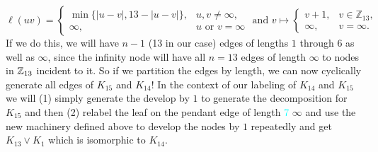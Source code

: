 $$\ell(uv)=\begin{cases}\min\{|u-v|,13-|u-v|\}, & u,v\neq \infty, \\ \infty, & u\text{ or }v=\infty \end{cases} \text{ and }v\mapsto 
\begin{cases}
  v+1,&v\in\mathbb{Z}_{13},\\
  \infty,        &v=\infty.
  \end{cases}$$
If we do this, we will have $n-1$ (13 in our case) edges of lengths $1$ through $6$ as well as $\infty$, since the infinity node will have all $n=13$ edges of length $\infty$ to nodes in $\mathbb{Z}_{13}$ incident to it. So if we partition the edges by length, we can now cyclically generate all edges of $K_{15}$ and $K_{14}$! In the context of our labeling of $K_{14}$ and $K_{15}$ we will (1) simply generate the develop by $1$ to generate the decomposition for $K_{15}$ and then (2) relabel the leaf on the pendant edge of length \textcolor{cyan}{7} $\infty$ and use the new machinery defined above to develop the nodes by $1$ repeatedly and get $K_{13}\vee K_{1}$ which is isomorphic to $K_{14}$.

